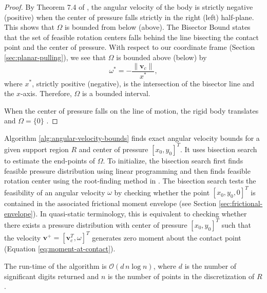 \documentclass[conference]{IEEEtran}
\begin{document}
\begin{proof}
  By Theorem 7.4 of \cite{Mason}, the angular velocity of the body is
  strictly negative (positive) when the center of pressure falls
  strictly in the right (left) half-plane. This shows that $\Omega$ is
  bounded from below (above). The Bisector Bound \cite{Mason} states
  that the set of feasible rotation centers falls behind the line
  bisecting the contact point and the center of pressure. With respect
  to our coordinate frame (Section \ref{sec:planar-pulling}), we see
  that $\Omega$ is bounded above (below) by 
  \begin{equation}
    \omega^* = -\frac{\lVert\mathbf{v}_c\rVert}{x^*},
  \end{equation}
  where $x^*$, strictly positive (negative), is the intersection of
  the bisector line and the $x$-axis. Therefore, $\Omega$ is a
  bounded interval.

  When the center of pressure falls on the line of motion, the rigid
  body translates and $\Omega = \{0\}$ \cite{Mason}.
\end{proof}

Algorithm \ref{alg:angular-velocity-bounds} finds exact angular
velocity bounds for a given support region $R$ and center of pressure
$[x_0,y_0]^T$. It uses bisection search to estimate the end-points of
$\Omega$. To initialize, the bisection search first finds feasible
pressure distribution using linear programming and then finds feasible
rotation center using the root-finding method in \cite{Mason1982}. The
bisection search tests the feasibility of an angular velocity $\omega$
by checking whether the point $[x_0,y_0,0]^T$ is contained in the
associated frictional moment envelope (see Section
\ref{sec:frictional-envelope}). In quasi-static terminology, this is
equivalent to checking whether there exists a pressure distribution
with center of pressure $[x_0,y_0]^T$ such that the velocity
$\mathbf{v}^+ = [\mathbf{v}_c^T, \omega]^T$ generates zero moment
about the contact point (Equation \ref{eq:moment-at-contact}).

The run-time of the algorithm is $\mathcal{O}(d\,n\log{} n)$, where
$d$ is the number of significant digits returned and $n$ is the number
of points in the discretization of $R$.
\end{document}
